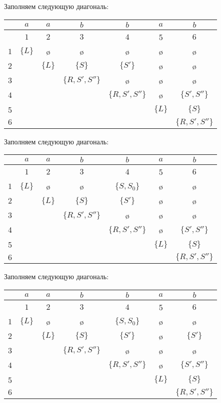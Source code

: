 \begin{example}
Заполняем следующую диагональ:

\begin{center}
  \begin{tabular}{c||cc|cc|cc}
    & $a$ & $a$ & $b$ & $b$ & $a$ & $b$ \\ \hline
    & $1$ & $2$ & $3$ & $4$ & 5 & $6$ \\ \hline \hline
  $1$ & $\{L\}$ & \o & \o & \o & \o & \o \\ 
  $2$ &   & $\{L\}$ & $\{S\}$ & $\{S'\}$ & \o & \o \\ \hline
  $3$ &   &   & $\{R, S', S''\}$ & \o & \o & \o \\ 
  $4$ &   &   &   & $\{R, S', S''\}$ & \o & $\{S', S''\}$ \\ \hline
  5 &   &   &   &   & $\{L\}$ & $\{S\}$ \\ 
  $6$ &   &   &   &   &   & $\{R, S', S''\}$
  \end{tabular}
\end{center}

Заполняем следующую диагональ:

\begin{center}
  \begin{tabular}{c||cc|cc|cc}
    & $a$ & $a$ & $b$ & $b$ & $a$ & $b$ \\ \hline
    & $1$ & $2$ & $3$ & $4$ & 5 & $6$ \\ \hline \hline
  $1$ & $\{L\}$ & \o & \o & $\{S, S_0\}$ & \o & \o \\ 
  $2$ &   & $\{L\}$ & $\{S\}$ & $\{S'\}$ & \o & \o \\ \hline
  $3$ &   &   & $\{R, S', S''\}$ & \o & \o & \o \\ 
  $4$ &   &   &   & $\{R, S', S''\}$ & \o & $\{S', S''\}$ \\ \hline
  5 &   &   &   &   & $\{L\}$ & $\{S\}$ \\ 
  $6$ &   &   &   &   &   & $\{R, S', S''\}$
  \end{tabular}
\end{center}

Заполняем следующую диагональ:

\begin{center}
  \begin{tabular}{c||cc|cc|cc}
    & $a$ & $a$ & $b$ & $b$ & $a$ & $b$ \\ \hline
    & $1$ & $2$ & $3$ & $4$ & 5 & $6$ \\ \hline \hline
  $1$ & $\{L\}$ & \o & \o & $\{S, S_0\}$ & \o & \o \\ 
  $2$ &   & $\{L\}$ & $\{S\}$ & $\{S'\}$ & \o & $\{S'\}$ \\ \hline
  $3$ &   &   & $\{R, S', S''\}$ & \o & \o & \o \\ 
  $4$ &   &   &   & $\{R, S', S''\}$ & \o & $\{S', S''\}$ \\ \hline
  5 &   &   &   &   & $\{L\}$ & $\{S\}$ \\ 
  $6$ &   &   &   &   &   & $\{R, S', S''\}$
  \end{tabular}
\end{center}


\end{example}
